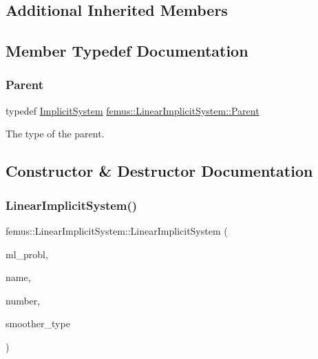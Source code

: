 \subsection*{Additional Inherited Members}


\subsection{Member Typedef Documentation}
\mbox{\label{classfemus_1_1_linear_implicit_system_adfad06f69aa5ec8ddeefa0b430480a1d}} 
\subsubsection{\texorpdfstring{Parent}{Parent}}
{\footnotesize\ttfamily typedef \mbox{\hyperlink{classfemus_1_1_implicit_system}{Implicit\+System}} \mbox{\hyperlink{classfemus_1_1_linear_implicit_system_adfad06f69aa5ec8ddeefa0b430480a1d}{femus\+::\+Linear\+Implicit\+System\+::\+Parent}}}

The type of the parent. 

\subsection{Constructor \& Destructor Documentation}
\mbox{\label{classfemus_1_1_linear_implicit_system_abb2b154f0d4810da64d7a4ac269b1ae4}} 
\subsubsection{\texorpdfstring{Linear\+Implicit\+System()}{LinearImplicitSystem()}}
{\footnotesize\ttfamily femus\+::\+Linear\+Implicit\+System\+::\+Linear\+Implicit\+System (\begin{DoxyParamCaption}\item[{\mbox{\hyperlink{classfemus_1_1_multi_level_problem}{Multi\+Level\+Problem}} \&}]{ml\+\_\+probl,  }\item[{const std\+::string \&}]{name,  }\item[{const unsigned int}]{number,  }\item[{const \mbox{\hyperlink{_mg_smoother_enum_8hpp_a4d11c2ff93e2f0f440c879a9c40cda71}{Mg\+Smoother}} \&}]{smoother\+\_\+type }\end{DoxyParamCaption})}

